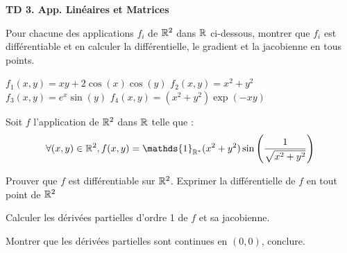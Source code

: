 \documentclass{report}
\begin{document}
\begin{center}
    \Huge{\textbf{TD 3. App. Linéaires et Matrices}}
\end{center}
\bigskip

\begin{exo}
    Pour chacune des applications \(f_i\) de \(\mathbb{R}^2\) dans \(\mathbb{R}\) ci-dessous,
    montrer que \(f_i\) est différentiable et en calculer la différentielle, le
    gradient et la jacobienne en tous points.
    \begin{enumerate}
        \itt \(f_1(x,y) = xy+2\cos(x)\cos(y)\)
        \itt \(f_2(x,y) = x^2+y^2\)
        \itt \(f_3(x,y) = e^x\sin(y)\)
        \itt \(f_4(x,y) = (x^2+y^2)\exp(-xy)\)
    \end{enumerate}
\end{exo}

\begin{exo}
    Soit \(f\) l'application de \(\mathbb{R}^2\) dans \(\mathbb{R}\) telle que :
    \[\forall (x,y)\in\R^2, f(x,y)=\mathds{1}_{\R^*}(x^2+y^2)\sin\left(\frac{1}{\sqrt{x^2+y^2}}\right)\]
    \begin{q}{1}
        Prouver que \(f\) est différentiable sur \(\mathbb{R}^2\). Exprimer la
        différentielle de \(f\) en tout point de \(\mathbb{R}^2\)
    \end{q}
    \begin{q}{2}
        Calculer les dérivées partielles d'ordre 1 de \(f\) et sa jacobienne.
    \end{q}
    \begin{q}{3}
        Montrer que les dérivées partielles sont continues en \((0,0)\), conclure.
    \end{q}
\end{exo}
\end{document}
